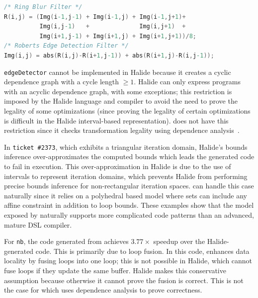 \vspace{-0.15cm}
\begin{lstlisting}[language=C,escapechar=@,numbers=none]
/* Ring Blur Filter */
R(i,j) = (Img(i-1,j-1) + Img(i-1,j) + Img(i-1,j+1)+
          Img(i,j-1)   +              Img(i,j+1)  +
          Img(i+1,j-1) + Img(i+1,j) + Img(i+1,j+1))/8;
/* Roberts Edge Detection Filter */
Img(i,j) = abs(R(i,j)-R(i+1,j-1)) + abs(R(i+1,j)-R(i,j-1));
\end{lstlisting}
\vspace{-0.15cm}

\texttt{edgeDetector} cannot be implemented in Halide because it creates a cyclic dependence graph with a cycle length $\geq 1$.
Halide can only express programs with an acyclic dependence graph, with some exceptions;  this restriction is imposed by the Halide language and compiler to avoid the need to prove the legality of some optimizations (since proving the legality of certain optimizations is difficult in the Halide interval-based representation).
\framework{} does not have this restriction since it checks transformation legality using dependence analysis~\cite{feautrier_dataflow_1991}.

In \texttt{ticket \#2373}, which exhibits a triangular iteration domain,  Halide's bounds inference over-approximates the computed bounds which leads the generated code to fail in execution.  This over-approximation in Halide is due to the use of intervals to represent iteration domains, which prevents Halide from performing precise bounds inference for non-rectangular iteration spaces.  \framework{} can handle this case naturally since it relies on a polyhedral based model where sets can include any affine constraint  in addition to loop bounds.  These examples show that the model exposed by \framework{} naturally supports more complicated code patterns than an advanced, mature DSL compiler.

For \texttt{nb}, the code generated from \framework{} achieves $3.77\times$ speedup over the Halide-generated code. This is primarily due to loop fusion.  In this code, \framework{} enhances data locality by fusing loops into one loop;  this is not possible in Halide, which cannot fuse loops if they update the same buffer.  Halide makes this conservative assumption because otherwise it cannot prove the fusion is correct. This is not the case for \framework{} which uses dependence analysis to prove correctness.


